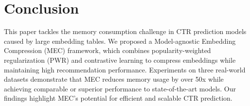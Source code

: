 \section{Conclusion}
This paper tackles the memory consumption challenge in CTR prediction models caused by large embedding tables. We proposed a Model-agnostic Embedding Compression (MEC) framework, which combines popularity-weighted regularization (PWR) and contrastive learning to compress embeddings while maintaining high recommendation performance. Experiments on three real-world datasets demonstrate that MEC reduces memory usage by over 50x while achieving comparable or superior performance to state-of-the-art models. Our findings highlight MEC's potential for efficient and scalable CTR prediction.
\vspace{2pt}
